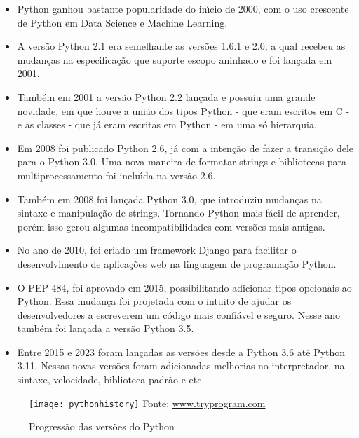 \begin{itemize} [itemsep=5pt, parsep=5pt]
\item Python ganhou bastante popularidade do in\'{\i}cio de 2000, com o uso crescente de Python em Data Science e Machine Learning.

\item A vers\~{a}o Python 2.1 era semelhante as vers\~{o}es 1.6.1 e 2.0, a qual recebeu as mudan\c{c}as na especifica\c{c}\~{a}o que suporte escopo aninhado e foi lan\c{c}ada em 2001.

\item Tamb\'{e}m em 2001 a vers\~{a}o Python 2.2 lan\c{c}ada e possuiu uma grande novidade, em que houve a uni\~{a}o dos tipos Python - que eram escritos em C - e as classes - que j\'{a} eram escritas em Python - em uma s\'{o} hierarquia.

\item Em 2008 foi publicado Python 2.6, j\'{a} com a inten\c{c}\~{a}o de fazer a transi\c{c}\~{a}o dele para o Python 3.0. Uma nova maneira de formatar strings e bibliotecas para multiprocessamento foi inclu\'{\i}da na vers\~{a}o 2.6.

\item Tamb\'{e}m em 2008 foi lan\c{c}ada Python 3.0, que introduziu mudan\c{c}as na sintaxe e manipula\c{c}\~{a}o de strings. Tornando Python mais f\'{a}cil de aprender, por\'{e}m isso gerou algumas incompatibilidades com vers\~{o}es mais antigas.

\item No ano de 2010, foi criado um framework Django para facilitar o desenvolvimento de aplica\c{c}\~{o}es web na linguagem de programa\c{c}\~{a}o Python.

\item O PEP 484, foi aprovado em 2015, possibilitando adicionar tipos opcionais ao Python. Essa mudan\c{c}a foi projetada com o intuito de ajudar os desenvolvedores a escreverem um c\'{o}digo mais confi\'{a}vel e seguro. Nesse ano tamb\'{e}m foi lan\c{c}ada a vers\~{a}o Python 3.5.

\item Entre 2015 e 2023 foram lan\c{c}adas as vers\~{o}es desde a Python 3.6 at\'{e} Python 3.11. Nessas novas vers\~{o}es foram adicionadas melhorias no interpretador, na sintaxe, velocidade, biblioteca padr\~{a}o e etc. 

\end{itemize}

\begin{figure}[H]
\begin{center}
		\caption{Progress\~{a}o das vers\~{o}es do Python} \label{ling1}
		\texttt{[image: pythonhistory]} \newline
		Fonte: \url{www.tryprogram.com}
\end{center}
\end{figure}

